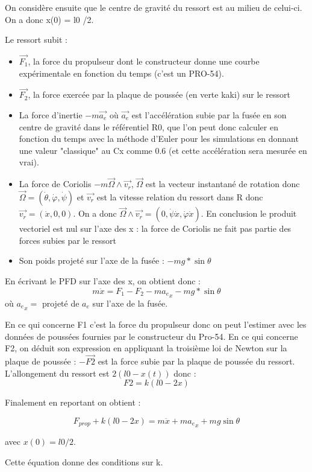 \documentclass[a4paper,12pt]{scrartcl}
\begin{document}
	On considère ensuite que le centre de gravité du ressort est au milieu de celui-ci.
	On a donc x(0) = l0 /2. 

	Le ressort subit  : 
	\begin{itemize}
	\item $\vec{F_1}$, la force du propulseur dont le constructeur donne une courbe expérimentale en fonction du temps (c'est un PRO-54).
	\item $\vec{F_2}$, la force exercée par la plaque de poussée (en verte kaki) sur le ressort
	\item La force d'inertie $-m \vec{a_e}$ où $\vec{a_e}$ est l'accélération subie par la fusée en son centre de gravité dans le 	référentiel R0, que l'on peut donc calculer en fonction du temps avec la méthode d'Euler pour les simulations en donnant une valeur 	"classique" au Cx comme 0.6 (et cette accélération sera mesurée en vrai).
	\item La force de Coriolis $-m\vec{\Omega} \wedge \vec{v_r}$, $\vec{\Omega}$ est la vecteur instantané de rotation donc $\vec{\Omega} = (\dot{\theta}, \dot{\varphi}, \dot{\psi})$ et $\vec{v_r}$ est la vitesse relation du ressort dans R donc $\vec{v_r} = (\dot{x}, 0, 0)$.
On a donc $\vec{\Omega} \wedge \vec{v_r} = (0, \dot{\psi} \dot{x}, \dot{\varphi} \dot{x})$.
En conclusion le produit vectoriel est nul sur l'axe des x : la force de Coriolis ne fait pas partie des forces subies par le ressort 

	\item Son poids projeté sur l'axe de la fusée : $-mg*\sin{\theta}$
	\end{itemize}

	En écrivant le PFD sur l'axe des x, on obtient donc : $$ m\ddot{x} = F_1 - F_2 -m{a_e}_x -mg*\sin{\theta}$$ où ${a_e}_x =$ projeté de $a_e$ sur l'axe de la fusée.

	En ce qui concerne F1 c'est la force du propulseur donc on peut l'estimer avec les données de poussées fournies par le constructeur 	du Pro-54.
	En ce qui concerne F2, on déduit son expression en appliquant la troisième loi de Newton sur la plaque de poussée : $-\vec{F2}$ est 	la force subie par la plaque de poussée du ressort. L'allongement du ressort est $2(l0-x(t))$ donc :
	$$F2 = k(l0-2x)$$


	Finalement en reportant on obtient : 

	$$F_{prop} + k(l0-2x) = m \ddot{x}+m{a_e}_x +mg\sin{\theta}$$ 

	avec $x(0) = l0/2$.

	Cette équation donne des conditions sur k.
\end{document}
